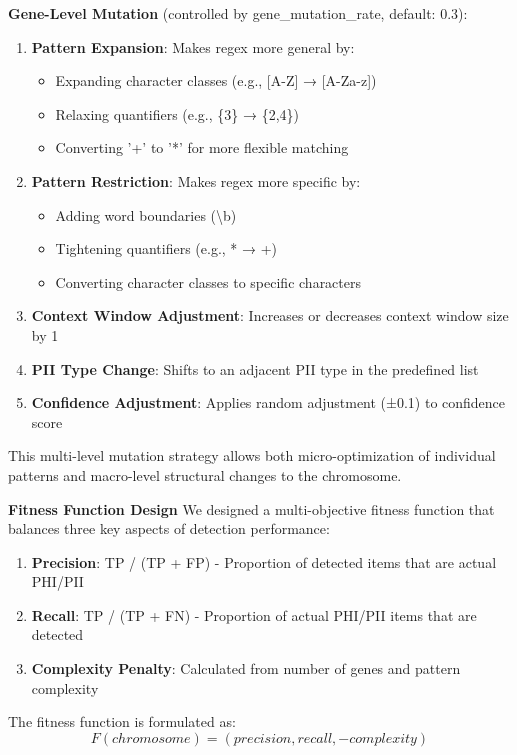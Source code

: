 \documentclass[conference]{IEEEtran}
\begin{document}
\textbf{Gene-Level Mutation} (controlled by gene\_mutation\_rate, default: 0.3):
\begin{enumerate}
\item \textbf{Pattern Expansion}: Makes regex more general by:
   \begin{itemize}
   \item Expanding character classes (e.g., [A-Z] → [A-Za-z])
   \item Relaxing quantifiers (e.g., \{3\} → \{2,4\})
   \item Converting '+' to '*' for more flexible matching
   \end{itemize}
\item \textbf{Pattern Restriction}: Makes regex more specific by:
   \begin{itemize}
   \item Adding word boundaries (\textbackslash b)
   \item Tightening quantifiers (e.g., * → +)
   \item Converting character classes to specific characters
   \end{itemize}
\item \textbf{Context Window Adjustment}: Increases or decreases context window size by 1
\item \textbf{PII Type Change}: Shifts to an adjacent PII type in the predefined list
\item \textbf{Confidence Adjustment}: Applies random adjustment (±0.1) to confidence score
\end{enumerate}

This multi-level mutation strategy allows both micro-optimization of individual patterns and macro-level structural changes to the chromosome.

\textbf{Fitness Function Design}
We designed a multi-objective fitness function that balances three key aspects of detection performance:
\begin{enumerate}
\item \textbf{Precision}: TP / (TP + FP) - Proportion of detected items that are actual PHI/PII
\item \textbf{Recall}: TP / (TP + FN) - Proportion of actual PHI/PII items that are detected
\item \textbf{Complexity Penalty}: Calculated from number of genes and pattern complexity
\end{enumerate}

The fitness function is formulated as:
\begin{equation}
F(chromosome) = (precision, recall, -complexity)
\end{equation}
\end{document}
